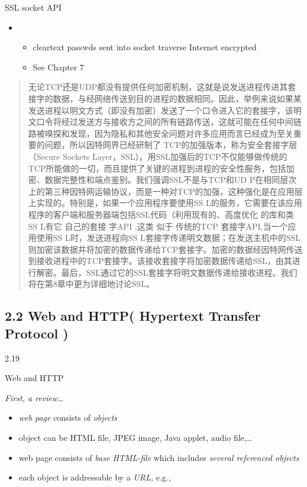 \documentclass[
]{article}
\begin{document}
SSL socket API

\begin{itemize}
\item
  \begin{itemize}
  \item
    cleartext passwds sent into socket traverse Internet encrypted
  \item
    See Chapter 7
  \end{itemize}
\end{itemize}

\begin{quote}
无论TCP还是UDP都没有提供任何加密机制，这就是说发送进程传进其套接字的数据，与经网络传送到目的进程的数据相同。因此，举例来说如果某发送进程以明文方式（即没有加密）发送了一个口令进入它的套接字，该明文口令将经过发送方与接收方之间的所有链路传送，这就可能在任何中间链路被嗅探和发现，因为隐私和其他安全问题对许多应用而言已经成为至关重要的问题，所以因特网界已经研制了
TCP的加强版本，称为安全套接字层（Secure Sockets
Layer，SSL）。用SSL加强后的TCP不仅能够做传统的TCP所能做的一切，而且提供了关键的进程到进程的安全性服务，包括加密、数据完整性和端点鉴别。我们强调SSL不是与TCP和UD
P在相同层次上的第三种因特网运输协议，而是一种对TCP的加强，这种强化是在应用层上实现的。特别是，如果一个应用程序要使用SS
L的服务，它需要在该应用程序的客户端和服务器端包括SSL代码（利用现有的、高度优化
的库和类SS L有它 自己的套接 字API ,这类 似于 传统的TCP
套接字API,当一个应用使用SS L时，发送进程向SS
L套接字传递明文数据；在发送主机中的SSL则加密该数据并将加密的数据传递给TCP套接字。加密的数据经因特网传送到接收进程中的TCP套接字。该接收套接字将加密数据传递给SSL，由其进行解密。最后，SSL通过它的SSL套接字将明文数据传递给接收进程。我们将在第8章中更为详细地讨论SSL。
\end{quote}

\hypertarget{22-web-and-http-hypertext-transfer-protocol-}{%
\subsection{2.2 Web and HTTP( Hypertext Transfer Protocol
)}\label{22-web-and-http-hypertext-transfer-protocol-}}

2.19

Web and HTTP

\emph{First, a review\ldots{}}

\begin{itemize}
\item
  \emph{web page} consists of \emph{objects}
\item
  object can be HTML file, JPEG image, Java applet, audio file,\ldots{}
\item
  web page consists of \emph{base HTML-file} which includes
  \emph{several referenced objects}
\item
  each object is addressable by a \emph{URL,} e.g.,
\end{itemize}
\end{document}
